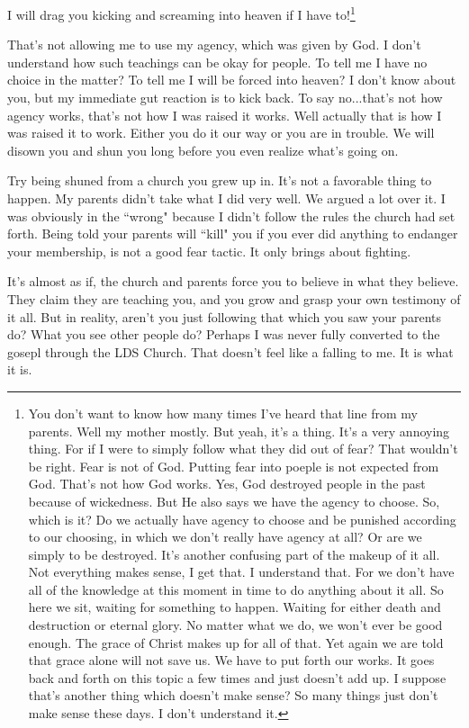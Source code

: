 \begin{displayquote}
I will drag you kicking and screaming into heaven if I have to!\footnote{
You don't want to know how many times I've heard that line from my parents. Well
my mother mostly. But yeah, it's a thing. It's a very annoying thing. For if I
were to simply follow what they did out of fear? That wouldn't be right. Fear is
not of God. Putting fear into poeple is not expected from God. That's not how
God works. Yes, God destroyed people in the past because of wickedness. But He
also says we have the agency to choose. So, which is it? Do we actually have
agency to choose and be punished according to our choosing, in which we don't
really have agency at all? Or are we simply to be destroyed. It's another
confusing part of the makeup of it all. Not everything makes sense, I get that.
I understand that. For we don't have all of the knowledge at this moment in time
to do anything about it all. So here we sit, waiting for something to happen.
Waiting for either death and destruction or eternal glory. No matter what we do,
we won't ever be good enough. The grace of Christ makes up for all of that. Yet
again we are told that grace alone will not save us. We have to put forth our
works. It goes back and forth on this topic a few times and just doesn't add up.
I suppose that's another thing which doesn't make sense? So many things just
don't make sense these days. I don't understand it.
}
\end{displayquote}

That's not allowing me to use my agency, which was given by God. I don't
understand how such teachings can be okay for people. To tell me I have no
choice in the matter? To tell me I will be forced into heaven? I don't know
about you, but my immediate gut reaction is to kick back. To say no...that's not
how agency works, that's not how I was raised it works. Well actually that is
how I was raised it to work. Either you do it our way or you are in trouble. We
will disown you and shun you long before you even realize what's going on.

Try being shuned from a church you grew up in. It's not a favorable thing to
happen. My parents didn't take what I did very well. We argued a lot over it. I
was obviously in the ``wrong" because I didn't follow the rules the church had
set forth. Being told your parents will ``kill" you if you ever did anything to
endanger your membership, is not a good fear tactic. It only brings about
fighting.

It's almost as if, the church and parents force you to believe in what they
believe. They claim they are teaching you, and you grow and grasp your own
testimony of it all. But in reality, aren't you just following that which you
saw your parents do? What you see other people do? Perhaps I was never fully
converted to the gosepl through the LDS Church. That doesn't feel like a falling
to me. It is what it is.